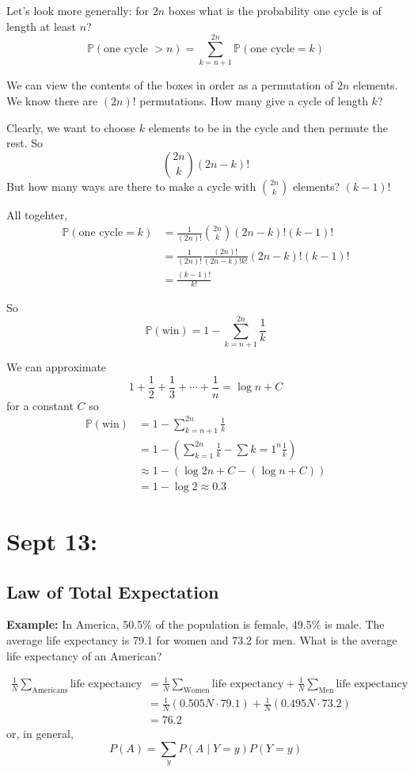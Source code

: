 \documentclass[12pt]{article}
\renewcommand{\P}{\mathbb{P}}
\begin{document}
    Let's look more generally: for $2n$ boxes what is the probability one cycle is of length at least $n$?
    \[\P(\text{one cycle } > n) = \sum_{k={n+1}}^{2n} \P(\text{one cycle} = k)\]

    We can view the contents of the boxes in order as a permutation of $2n$ elements. We know there are $(2n)!$ permutations. How many give a cycle of length $k$?

    Clearly, we want to choose $k$ elements to be in the cycle and then permute the rest. So
    \[\binom{2n}{k}(2n - k)!\]
    But how many ways are there to make a cycle with $\binom{2n}{k}$ elements? $(k-1)!$ 

    All togehter, 
    \begin{align*}
        \P(\text{one cycle} = k) &= \frac{1}{(2n)!} \binom{2n}{k}(2n - k)!(k-1)!\\ 
        &= \frac{1}{(2n)!}\frac{(2n)!}{(2n -k)!k!} (2n-k)!(k-1)!\\ 
        &= \frac{(k-1)!}{k!}
    \end{align*}

    So 
    \[\P(\text{win}) = 1 - \sum_{k=n+1}^{2n} \frac{1}{k}\]

    We can approximate 
    \[1 + \frac{1}{2} + \frac{1}{3} + \cdots + \frac{1}{n} = \log n + C\]
    for a constant $C$ so 
    \begin{align*}
        \P(\text{win}) &= 1 - \sum_{k=n+1}^{2n} \frac{1}{k}\\ 
        &= 1 - \left(\sum_{k=1}^{2n} \frac{1}{k} - \sum{k=1}^n \frac{1}{k}\right)\\ 
        &\approx 1 - (\log 2n + C - (\log n + C))\\ 
        &= 1 - \log 2 \approx 0.3
    \end{align*}

\section{Sept 13:}
\subsection*{Law of Total Expectation}
    \textbf{Example:} In America, 50.5\% of the population is female, 49.5\% is male. The average life expectancy is 79.1 for women and 73.2 for men. What is the average life expectancy of an American?

    \begin{align*}
        \frac{1}{N} \sum_{\text{Americans}} \text{life expectancy} &= \frac{1}{N} \sum_{\text{Women}} \text{life expectancy} + \frac{1}{N} \sum_{\text{Men}} \text{life expectancy}\\
        &= \frac{1}{N}(0.505N \cdot 79.1) + \frac{1}{N}(0.495N \cdot 73.2)\\
        &= 76.2
    \end{align*}
    or, in general, 
    \[P(A) = \sum_y P(A \; | \; Y = y)P(Y = y)\]
\end{document}
